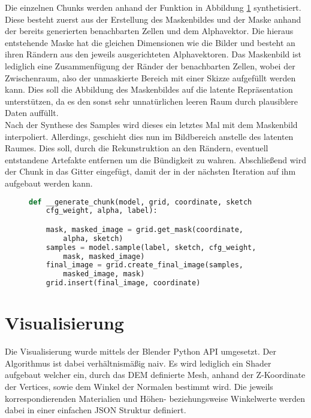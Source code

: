 Die einzelnen Chunks werden anhand der Funktion in Abbildung \ref{fig:gen_chunk} synthetisiert. Diese besteht zuerst aus der Erstellung des Maskenbildes und der Maske anhand der bereits generierten benachbarten Zellen und dem Alphavektor. Die hieraus entstehende Maske hat die gleichen Dimensionen wie die Bilder und besteht an ihren Rändern aus den jeweils ausgerichteten Alphavektoren. Das Maskenbild ist lediglich eine Zusammenfügung der Ränder der benachbarten Zellen, wobei der Zwischenraum, also der unmaskierte Bereich mit einer Skizze aufgefüllt werden kann. Dies soll die Abbildung des Maskenbildes auf die latente Repräsentation unterstützen, da es den sonst sehr unnatürlichen leeren Raum durch plausiblere Daten auffüllt. \\
Nach der Synthese des Samples wird dieses ein letztes Mal mit dem Maskenbild interpoliert. Allerdings, geschieht dies nun im Bildbereich anstelle des latenten Raumes. Dies soll, durch die Rekunstruktion an den Rändern, eventuell entstandene Artefakte entfernen um die Bündigkeit zu wahren. Abschließend wird der Chunk in das Gitter eingefügt, damit der in der nächsten Iteration auf ihm aufgebaut werden kann.
\begin{figure}[htbp]
\begin{lstlisting}[language=python]
def __generate_chunk(model, grid, coordinate, sketch
    cfg_weight, alpha, label):

    mask, masked_image = grid.get_mask(coordinate, 
        alpha, sketch)
    samples = model.sample(label, sketch, cfg_weight,
        mask, masked_image)
    final_image = grid.create_final_image(samples, 
        masked_image, mask)
    grid.insert(final_image, coordinate)
\end{lstlisting}
    \captionsetup{type=figure}
    \label{fig:gen_chunk}
\end{figure}



\section {Visualisierung}

Die Visualisierung wurde mittels der Blender Python API umgesetzt. Der Algorithmus ist dabei verhältnismäßig naiv. Es wird lediglich ein Shader aufgebaut welcher ein, durch das \ac{DEM} definierte Mesh, anhand der Z-Koordinate der Vertices, sowie dem Winkel der Normalen bestimmt wird. Die jeweils korrespondierenden Materialien und Höhen- beziehungsweise Winkelwerte werden dabei in einer einfachen JSON Struktur definiert. 